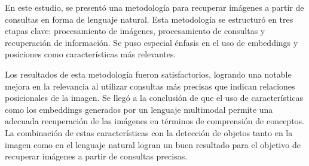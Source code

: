 \begin{conclusions}
    En este estudio, se presentó una metodología para recuperar imágenes a partir de consultas en forma de lenguaje natural. Esta metodología se estructuró en tres etapas clave: procesamiento de imágenes, procesamiento de consultas y recuperación de información. Se puso especial énfasis en el uso de embeddings y posiciones como características más relevantes.
    
    Los resultados de esta metodología fueron satisfactorios, logrando una notable mejora en la relevancia al utilizar consultas más precisas que indican relaciones posicionales de la imagen. Se llegó a la conclusión de que el uso de características como los embeddings generados por un lenguaje multimodal permite una adecuada recuperación de las imágenes en términos de comprensión de conceptos. La combinación de estas características con la detección de objetos tanto en la imagen como en el lenguaje natural logran un buen resultado para el objetivo de recuperar imágenes a partir de consultas precisas.
    \end{conclusions}
    
    
